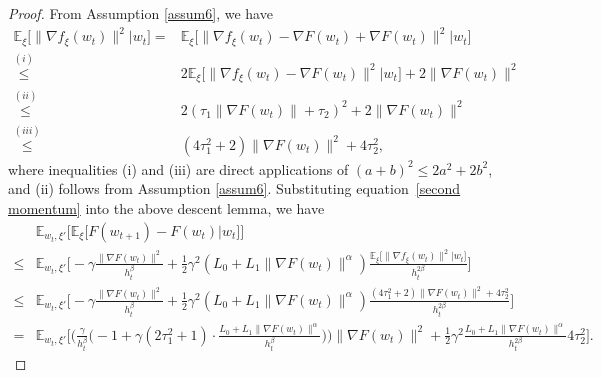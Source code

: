 \documentclass[10pt]{article} %
\def\eqref#1{equation~\ref{#1}}
\newtheorem{proof}{Proof}
\begin{document}
\begin{proof}
From Assumption \ref{assum6}, we have
\begin{align}
    \mathbb{E}_{\xi}\big [\big \|\nabla f_{\xi}(w_t)\big \|^2 |w_t \big]=&\mathbb{E}_{\xi}\big [\big \|\nabla f_{\xi}(w_t)-\nabla F(w_t)+\nabla F(w_t)\big \|^2 |w_t \big]\nonumber\\
    \overset{(i)}{\leq} & 2\mathbb{E}_{\xi}\big [\big \|\nabla f_{\xi}(w_t)-\nabla F(w_t)\big \|^2 |w_t \big]+2\big \| \nabla F(w_t) \big \|^2 \nonumber\\
    \overset{(ii)}{\leq} & 2(\tau_1\big \|\nabla F(w_t) \big \|+\tau_2)^2+2\big \| \nabla F(w_t)\big\|^2\nonumber \\
    \overset{(iii)}{\leq}& ({4\tau_1^2}+2) \big \|\nabla F(w_t) \big \|^2 + {4\tau_2^2},
    \label{second momentum}
\end{align}
where inequalities (i) and (iii) are direct applications of $(a+b)^2\leq 2a^2+2b^2$, and (ii) follows from Assumption \ref{assum6}.
Substituting \eqref{second momentum} into the above descent lemma, we have
\begin{align}
    &\mathbb{E}_{w_t, \xi'}\big[\mathbb{E}_{\xi}\big[F(w_{t+1})-F(w_t)|w_t \big]\big] \nonumber \\
    \leq& \mathbb{E}_{w_t, \xi'}\Big[ -\gamma \frac{
    \big \| \nabla F(w_t)\big \|^2}{h_t^{\beta}}+ \frac{1}{2}\gamma^2(L_0 + L_1\big \|\nabla F(w_t) \big \|^\alpha) \frac{\mathbb{E}_{\xi}\big [\big \|\nabla f_{\xi}(w_t)\big \|^2|w_t \big]}{h_t^{2\beta}} \Big]\nonumber\\
    \leq& \mathbb{E}_{w_t, \xi'}\Big[ -\gamma \frac{\big \| \nabla F(w_t)\big \|^2}{h_t^{\beta}} + \frac{1}{2}\gamma^2(L_0 + L_1\big \|\nabla F(w_t) \big \|^\alpha) \frac{(4\tau_1^2+2)\big \|\nabla F(w_t) \big \|^2 +4\tau_2^2 }{h_t^{2\beta}} \Big]\nonumber\\
    =& \mathbb{E}_{w_t, \xi'}\Big[ \Big(\frac{\gamma}{h_t^{\beta}}\big(-1+\gamma(2\tau_1^2+1)\cdot \frac{L_0+L_1 \big \|\nabla F(w_t) \big \|^{\alpha}}{h_t^{\beta}}\big)\Big) \|\nabla F(w_t) \big \|^2 + \frac{1}{2}\gamma^2\frac{L_0+L_1 \big \|\nabla F(w_t) \big \|^{\alpha}}{h_t^{2\beta}}{4\tau_2^2}\Big]. \label{eq: des_lem}

\end{align}
\end{proof}
\end{document}
